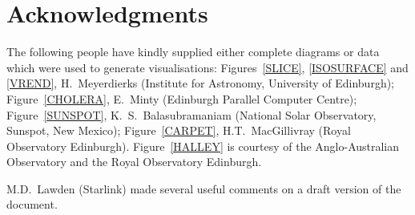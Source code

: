 \documentclass[twoside,11pt]{article}
\newcommand{\xlabel}[1]{}
\begin{document}

\newpage
\section{Acknowledgments \xlabel{ACK} }

The following people have kindly supplied either complete diagrams
or data which were used to generate visualisations: Figures~\ref{SLICE},
\ref{ISOSURFACE} and \ref{VREND}, H.~Meyerdierks (Institute for
Astronomy, University of Edinburgh); Figure~\ref{CHOLERA},
E.~Minty (Edinburgh Parallel Computer Centre); Figure~\ref{SUNSPOT},
K.~S.~Balasubramaniam (National Solar Observatory, Sunspot, New Mexico);
Figure~\ref{CARPET}, H.T.~MacGillivray (Royal Observatory Edinburgh).
Figure~\ref{HALLEY} is courtesy of the Anglo-Australian Observatory and
the Royal Observatory Edinburgh.

M.D.~Lawden (Starlink) made several useful comments on a draft version of
the document.

\end{document}
